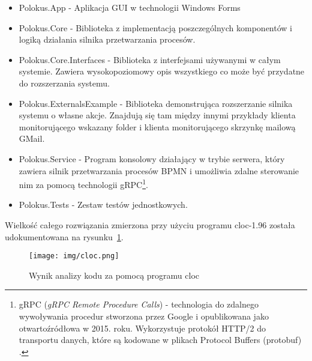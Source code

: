 \documentclass[declaration,shortabstract,mgr]{iithesis}
\newcommand{\bpmn}{BPMN }
\begin{document}
\begin{itemize}
    \item Polokus.App - Aplikacja GUI w technologii Windows Forms
    \item Polokus.Core - Biblioteka z implementacją poszczególnych komponentów i logiką działania silnika przetwarzania procesów.
    \item Polokus.Core.Interfaces - Biblioteka z interfejsami używanymi w całym systemie. Zawiera wysokopoziomowy opis wszystkiego co może być przydatne do rozszerzania systemu.
    \item Polokus.ExternalsExample - Biblioteka demonstrująca rozszerzanie silnika systemu o własne akcje. Znajdują się tam między innymi przykłady klienta monitorującego wskazany folder i klienta monitorującego skrzynkę mailową GMail.
    \item Polokus.Service - Program konsolowy działający w trybie serwera, który zawiera silnik przetwarzania procesów \bpmn i umożliwia zdalne sterowanie nim za pomocą technologii gRPC\footnote{gRPC (\textit{gRPC Remote Procedure Calls}) - technologia do zdalnego wywoływania procedur stworzona przez Google i opublikowana jako otwartoźródłowa w 2015. roku. Wykorzystuje protokół HTTP/2 do transportu danych, które są kodowane w plikach Protocol Buffers (protobuf) \cite{wiki-grpc}.}.
    \item Polokus.Tests - Zestaw testów jednostkowych.
\end{itemize}

 Wielkość całego rozwiązania zmierzona przy użyciu programu cloc-1.96 \cite{cloc} została udokumentowana na rysunku~\ref{fig:cloc}.

\begin{figure}[H]
    \texttt{[image: img/cloc.png]}
    \caption{Wynik analizy kodu za pomocą programu cloc}
    \label{fig:cloc}
\end{figure}

\end{document}
